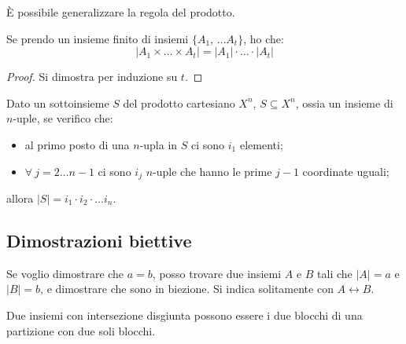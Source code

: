 \`E possibile generalizzare la regola del prodotto.
\begin{prop}
Se prendo un insieme finito di insiemi $\{ A_1$, $ \dots A_t \}$, ho che:
\[
\left| A_1 \times \dots \times A_t \right| = |A_1| \cdot \ldots \cdot |A_t|
\]
\end{prop}
\begin{proof}
Si dimostra per induzione su $t$.
\end{proof}

\begin{defn}
Dato un sottoinsieme $S$ del prodotto cartesiano $X^n$, $S \subseteq X^n$, ossia un insieme di $n$-uple, se verifico che:
\begin{itemize}
  \item al primo posto di una $n$-upla in $S$ ci sono $i_1$ elementi;
  \item $\forall \ j = 2 \dots n-1$ ci sono $i_j$ $n$-uple che hanno le prime $j-1$ coordinate uguali;
\end{itemize}
allora $|S| = i_1 \cdot i_2 \cdot \dots i_n$.
\end{defn}

\subsection{Dimostrazioni biettive}

Se voglio dimostrare che $a = b$, posso trovare due insiemi $A$ e $B$ tali che $|A| = a$ e $|B| = b$, e dimostrare che sono in biezione. Si indica solitamente con $A \leftrightarrow B$.

Due insiemi con intersezione disgiunta possono essere i due blocchi di una partizione con due soli blocchi.

